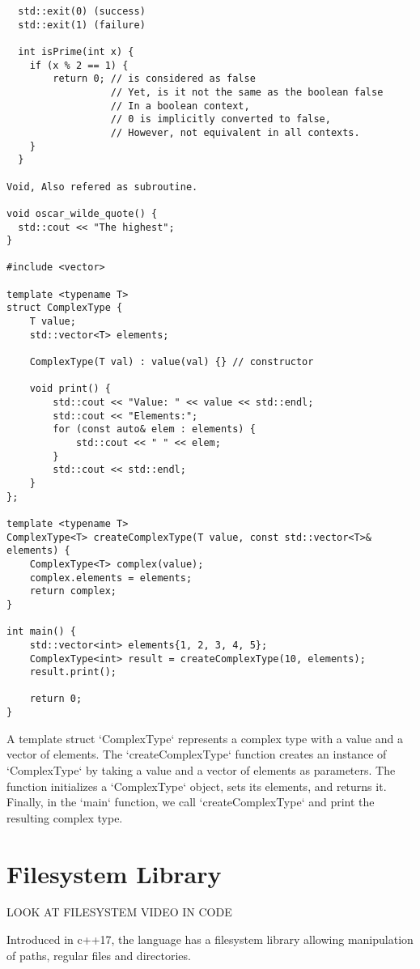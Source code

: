 \begin{verbatim}
  std::exit(0) (success)
  std::exit(1) (failure)

  int isPrime(int x) {
    if (x % 2 == 1) {
        return 0; // is considered as false
                  // Yet, is it not the same as the boolean false
                  // In a boolean context, 
                  // 0 is implicitly converted to false,
                  // However, not equivalent in all contexts.
    }
  }

Void, Also refered as subroutine.

void oscar_wilde_quote() {
  std::cout << "The highest";
}

#include <vector>

template <typename T>
struct ComplexType {
    T value;
    std::vector<T> elements;

    ComplexType(T val) : value(val) {} // constructor

    void print() {
        std::cout << "Value: " << value << std::endl;
        std::cout << "Elements:";
        for (const auto& elem : elements) {
            std::cout << " " << elem;
        }
        std::cout << std::endl;
    }
};

template <typename T>
ComplexType<T> createComplexType(T value, const std::vector<T>& elements) {
    ComplexType<T> complex(value);
    complex.elements = elements;
    return complex;
}

int main() {
    std::vector<int> elements{1, 2, 3, 4, 5};
    ComplexType<int> result = createComplexType(10, elements);
    result.print();

    return 0;
}

\end{verbatim}

A template struct `ComplexType` represents a complex type with a value and a vector of elements. 
The `createComplexType` function creates an instance of `ComplexType` by taking a value and a vector of elements
as parameters. The function initializes a `ComplexType` object, sets its elements, and returns it. 
Finally, in the `main` function, we call `createComplexType` and print the resulting complex type.

\chapter{Filesystem Library}

LOOK AT FILESYSTEM VIDEO IN CODE

Introduced in c++17, the language has a filesystem library allowing
manipulation of paths, regular files and directories.

